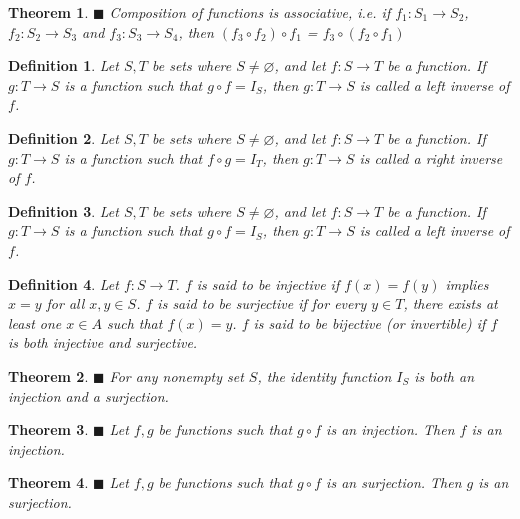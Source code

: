\documentclass[a4paper]{article}
\newtheorem{mytheorem}{Theorem}
\newtheorem{mydef}{Definition}
\numberwithin{mytheorem}{section}
\numberwithin{mydef}{section}
\numberwithin{axiom}{section}
\numberwithin{example}{section}
\newcommand{\done}{$\blacksquare$ }
\begin{document}
\begin{mytheorem} \done Composition of functions is associative, i.e. if $f_{1}: S_{1} \rightarrow S_{2}$, $f_{2}: S_{2} \rightarrow S_{3}$ and $f_{3}: S_{3} \rightarrow S_{4}$, then $(f_{3} \circ f_{2}) \circ f_{1}$ = $f_{3} \circ (f_{2} \circ f_{1})$
\end{mytheorem}

\begin{mydef} Let $S,T$ be sets where $S \neq \varnothing$, and let $f: S \rightarrow T$ be a function. If $g: T \rightarrow S$ is a function such that $g \circ f = I_{S}$, then $g: T \rightarrow S$ is called a left inverse of $f$. 
\end{mydef}

\begin{mydef} Let $S,T$ be sets where $S \neq \varnothing$, and let $f: S \rightarrow T$ be a function. If $g: T \rightarrow S$ is a function such that $f \circ g = I_{T}$, then $g: T \rightarrow S$ is called a right inverse of $f$. 
\end{mydef}

\begin{mydef} Let $S,T$ be sets where $S \neq \varnothing$, and let $f: S \rightarrow T$ be a function. If $g: T \rightarrow S$ is a function such that $g \circ f = I_{S}$, then $g: T \rightarrow S$ is called a left inverse of $f$. 
\end{mydef}

\begin{mydef} Let $f: S \rightarrow T$. $f$ is said to be injective if $f(x) = f(y)$ implies $x=y$ for all $x,y \in S$. $f$ is said to be surjective if for every $y \in T$, there exists at least one $x \in A$ such that $f(x) = y$. $f$ is said to be bijective (or invertible) if $f$ is both injective and surjective.
\end{mydef}

\begin{mytheorem} \done For any nonempty set $S$, the identity function $I_{S}$ is both an injection and a surjection.
\end{mytheorem}

\begin{mytheorem} \done Let $f,g$ be functions such that $g \circ f$ is an injection. Then $f$ is an injection.
\end{mytheorem}

\begin{mytheorem} \done Let $f,g$ be functions such that $g \circ f$ is an surjection. Then $g$ is an surjection.
\end{mytheorem}
\end{document}
